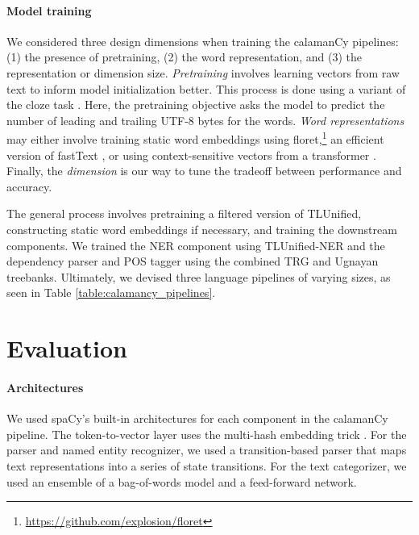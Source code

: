 \documentclass[11pt]{article}
\begin{document}


\paragraph*{Model training}

We considered three design dimensions when training the calamanCy pipelines: (1) the presence of pretraining, (2) the word representation, and (3) the representation or dimension size.
\textit{Pretraining} involves learning vectors from raw text to inform model initialization better.
This process is done using a variant of the cloze task \citep{Devlin2019BERTPO}.
Here, the pretraining objective asks the model to predict the number of leading and trailing UTF-8 bytes for the words.
\textit{Word representations} may either involve training static word embeddings using floret,\footnote[3]{\url{https://github.com/explosion/floret}} an efficient version of fastText \citep{Bojanowski2016EnrichingWV}, or using context-sensitive vectors from a transformer \citep{Vaswani2017AttentionIA}.
Finally, the \textit{dimension} is our way to tune the tradeoff between performance and accuracy.

The general process involves pretraining a filtered version of TLUnified, constructing static word embeddings if necessary, and training the downstream components.
We trained the NER component using TLUnified-NER and the dependency parser and POS tagger using the combined TRG and Ugnayan treebanks.
Ultimately, we devised three language pipelines of varying sizes, as seen in Table \ref{table:calamancy_pipelines}.

\section{Evaluation}



\paragraph*{Architectures}

We used spaCy's built-in architectures for each component in the calamanCy pipeline.
The token-to-vector layer uses the multi-hash embedding trick \citep{Miranda2022MultiHE}.
For the parser and named entity recognizer, we used a transition-based parser that maps text representations into a series of state transitions.
For the text categorizer, we used an ensemble of a bag-of-words model and a feed-forward network.
\end{document}
